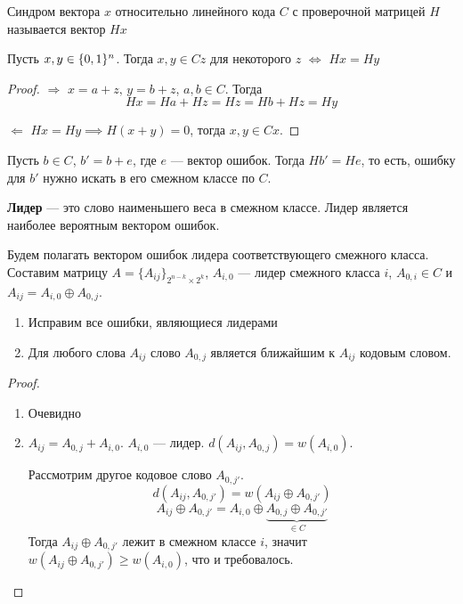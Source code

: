\begin{definition}
Синдром вектора $x$ относительно линейного кода $C$ с проверочной
матрицей $H$ называется вектор $Hx$
\end{definition}

\begin{theorem} 
Пусть $x,y \in \{0,1\}^n$. Тогда $x,y \in Cz$ для некоторого $z$ $\iff$
$Hx = Hy$
\end{theorem}

\begin{proof}
$\Rightarrow$ $x = a + z, \, y = b + z$, $a,b \in C$. Тогда
   $$Hx = Ha + Hz = Hz = Hb + Hz = Hy$$

$\Leftarrow$ $Hx = Hy \implies H (x + y) = 0$, тогда $x,y \in C x$.
\end{proof}

Пусть $b \in C$, $b' = b + e$, где $e$ --- вектор ошибок. Тогда
$H b' = He$, то есть, ошибку для $b'$ нужно искать в его смежном
классе по $C$.

{\bfseries Лидер} --- это слово наименьшего веса в смежном классе.
Лидер является наиболее вероятным вектором ошибок.

\begin{proposition}
Будем полагать вектором ошибок лидера соответствующего смежного класса.
Составим матрицу $A = \{A_{ij}\}_{2^{n-k} \times 2^k}$, $A_{i,0}$ ---
лидер смежного класса $i$, $A_{0,i} \in C$ и $A_{ij} = A_{i,0} \oplus
A_{0,j}$.
\begin{enumerate}
\item Исправим все ошибки, являющиеся лидерами
\item Для любого слова $A_{ij}$ слово $A_{0,j}$ является ближайшим к
     $A_{ij}$ кодовым словом.
\end{enumerate}
\end{proposition}

\begin{proof}
\begin{enumerate}
\item Очевидно
\item $A_{ij} = A_{0,j} + A_{i,0}$. $A_{i,0}$ --- лидер. 
      $d(A_{ij}, A_{0,j}) = w(A_{i,0})$. 
      
      Рассмотрим другое кодовое слово $A_{0,j'}$.
      $$d(A_{ij}, A_{0,j'}) = w(A_{ij} \oplus A_{0,j'})$$
        $$A_{ij} \oplus A_{0,j'} = 
      A_{i,0} \oplus \underbrace{A_{0,j} \oplus A_{0,j'}}_{\in C}$$
  Тогда $A_{ij} \oplus A_{0,j'}$ лежит в смежном классе $i$, значит
  $w(A_{ij} \oplus A_{0,j'}) \ge w(A_{i,0})$, что и требовалось.
\end{enumerate}
\end{proof}


